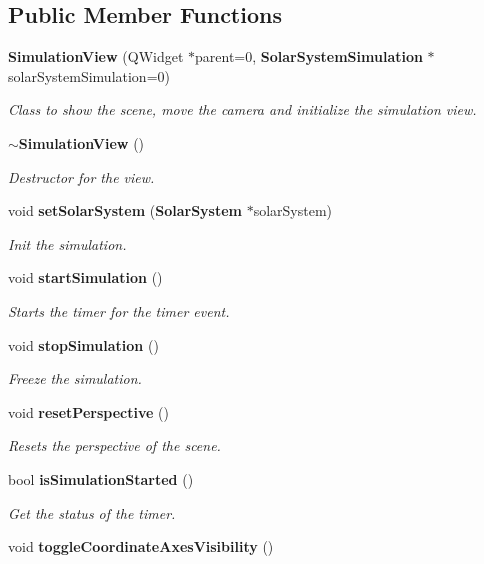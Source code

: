\subsection*{\-Public \-Member \-Functions}
\begin{DoxyCompactItemize}
\item 
{\bf \-Simulation\-View} (\-Q\-Widget $\ast$parent=0, {\bf \-Solar\-System\-Simulation} $\ast$solar\-System\-Simulation=0)
\begin{DoxyCompactList}\small\item\em \-Class to show the scene, move the camera and initialize the simulation view. \end{DoxyCompactList}\item 
{\bf $\sim$\-Simulation\-View} ()\label{d9/df6/classSimulationView_a7ccb9a29e3632431bba5a686da61d8a9}

\begin{DoxyCompactList}\small\item\em \-Destructor for the view. \end{DoxyCompactList}\item 
void {\bf set\-Solar\-System} ({\bf \-Solar\-System} $\ast$solar\-System)
\begin{DoxyCompactList}\small\item\em \-Init the simulation. \end{DoxyCompactList}\item 
void {\bf start\-Simulation} ()\label{d9/df6/classSimulationView_ae7936c84b92f7ae64a772a9ba1422624}

\begin{DoxyCompactList}\small\item\em \-Starts the timer for the timer event. \end{DoxyCompactList}\item 
void {\bf stop\-Simulation} ()\label{d9/df6/classSimulationView_ad51d8480373e82c73e3353c868df6f87}

\begin{DoxyCompactList}\small\item\em \-Freeze the simulation. \end{DoxyCompactList}\item 
void {\bf reset\-Perspective} ()\label{d9/df6/classSimulationView_acde2b2fb1ac01e85a8f8efbbe6717f12}

\begin{DoxyCompactList}\small\item\em \-Resets the perspective of the scene. \end{DoxyCompactList}\item 
bool {\bf is\-Simulation\-Started} ()
\begin{DoxyCompactList}\small\item\em \-Get the status of the timer. \end{DoxyCompactList}\item 
void {\bf toggle\-Coordinate\-Axes\-Visibility} ()\label{d9/df6/classSimulationView_a712a4c812faec9a14699c1ceb1048337}


\end{DoxyCompactItemize}

